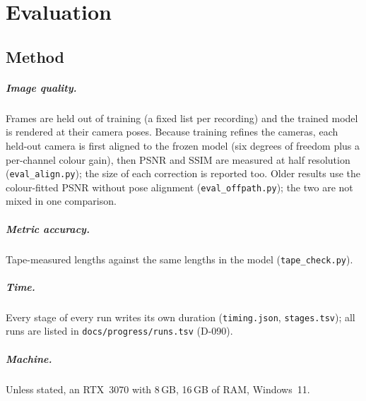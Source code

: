 \chapter{Evaluation}
\label{ch:evaluation}

\section{Method}
\paragraph{Image quality.} Frames are held out of training (a fixed list per recording) and the trained model is
rendered at their camera poses. Because training refines the cameras, each held-out camera is first aligned to the
frozen model (six degrees of freedom plus a per-channel colour gain), then PSNR and SSIM are measured at half resolution
(\texttt{eval\_align.py}); the size of each correction is reported too. Older results use the colour-fitted PSNR
without pose alignment (\texttt{eval\_offpath.py}); the two are not mixed in one comparison.
\paragraph{Metric accuracy.} Tape-measured lengths against the same lengths in the model (\texttt{tape\_check.py}).
\paragraph{Time.} Every stage of every run writes its own duration (\texttt{timing.json}, \texttt{stages.tsv}); all runs
are listed in \texttt{docs/progress/runs.tsv} (D-090).
\paragraph{Machine.} Unless stated, an RTX~3070 with 8\,GB, 16\,GB of RAM, Windows~11.

